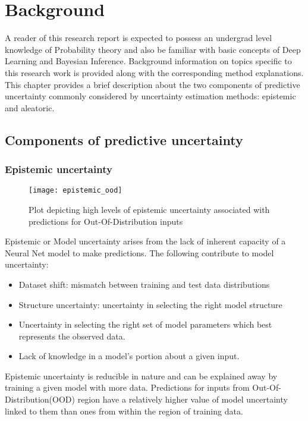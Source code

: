 

    \chapter{Background}
	A reader of this research report is expected to possess an undergrad level knowledge of Probability theory and also be familiar with basic concepts of Deep Learning and Bayesian Inference. Background information on topics specific to this research work is provided along with the corresponding method explanations. This chapter provides a brief description about the two components of predictive uncertainty commonly considered by uncertainty estimation methods: epistemic and aleatoric.
	\section{Components of predictive uncertainty} 
	\subsection{Epistemic uncertainty}
		\begin{figure}[H]
		\centering
		\texttt{[image: epistemic\_ood]}
		\caption{Plot depicting high levels of epistemic uncertainty associated with predictions for Out-Of-Distribution inputs}
		\label{fig_epi_ood}
		\end{figure}
	Epistemic or Model uncertainty arises from  the lack of inherent capacity of a Neural Net model to make predictions. The following contribute to model uncertainty:
	\begin{itemize}
		\item Dataset shift: mismatch between training and test data distributions
		\item Structure uncertainty: uncertainty in selecting the right model structure
		\item Uncertainty in selecting the right set of model parameters which best represents the observed data.
		\item Lack of knowledge in a model's portion about a given input.
	\end{itemize}
	Epistemic uncertainty is reducible in nature and can be explained away by training a given model with more data. Predictions for inputs from Out-Of-Distribution(OOD) region have a relatively higher value of model uncertainty linked to them than ones from within the region of training data. 

